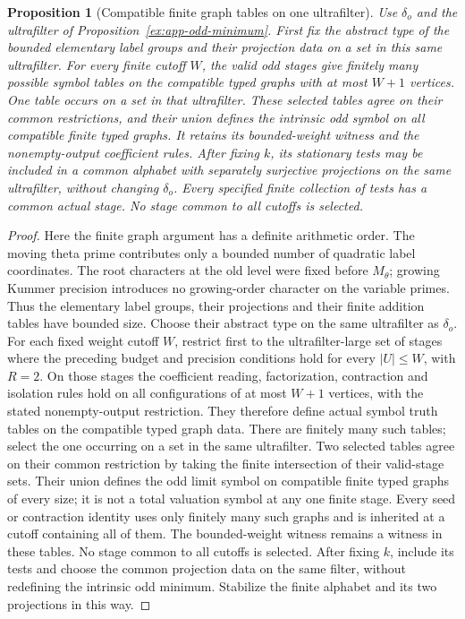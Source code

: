 \documentclass[11pt]{article}
\newtheorem{proposition}[theorem]{Proposition}
\theoremstyle{definition}
\theoremstyle{remark}
\begin{document}
\begin{proposition}[Compatible finite graph tables on one ultrafilter]\label{ex:app-odd-stabilization}
Use $\delta_o$ and the ultrafilter of
Proposition~\ref{ex:app-odd-minimum}. First fix the abstract type of
the bounded elementary label groups and their projection data on
a set in this same ultrafilter. For every finite cutoff $W$,
the valid odd stages give finitely many possible symbol tables on
the compatible typed graphs with at most $W+1$ vertices.
One table occurs on a set in that ultrafilter. These selected tables
agree on their common restrictions, and their union defines the
intrinsic odd symbol on all compatible finite typed graphs.
It retains its bounded-weight witness and the nonempty-output
coefficient rules. After fixing $k$, its stationary tests may be
included in a common alphabet with separately surjective
projections on the same ultrafilter, without changing $\delta_o$.
Every specified finite collection of tests has a common actual
stage. No stage common to all cutoffs is selected.
\end{proposition}
\begin{proof}\leavevmode
Here the finite graph argument has a definite arithmetic order.
The moving theta prime contributes only a bounded number of quadratic
label coordinates. The root characters at the old level were fixed
before $M_\theta$; growing Kummer precision introduces no growing-order
character on the variable primes. Thus the elementary label groups,
their projections and their finite addition tables have bounded size.
Choose their abstract type on the same ultrafilter as $\delta_o$.
For each fixed weight cutoff $W$, restrict first to the
ultrafilter-large set of stages where the preceding budget and
precision conditions hold for every $|U|\le W$, with $R=2$.
On those stages the coefficient reading, factorization, contraction
and isolation rules hold on all configurations of at most $W+1$
vertices, with the stated nonempty-output restriction.  They therefore define actual symbol truth tables on
the compatible typed graph data.  There are finitely many such
tables; select the one occurring on a set in the same ultrafilter.
Two selected tables agree on their common restriction by taking
the finite intersection of their valid-stage sets. Their union defines
the odd limit symbol on compatible finite typed graphs of every size;
it is not a total valuation symbol at any one finite stage.
Every seed or contraction identity uses only finitely many such graphs
and is inherited at a cutoff containing all of them.
The bounded-weight witness remains a witness in these tables.
No stage common to all cutoffs is selected.
After fixing $k$, include its tests and choose the common projection
data on the same filter, without redefining the intrinsic odd minimum.
Stabilize the finite alphabet and its two projections in this way.
\end{proof}
\end{document}

